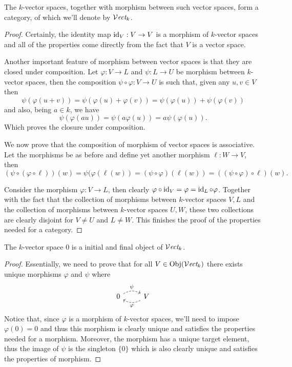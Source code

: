 \begin{proposition}\label{prop: category of vector spaces}
   The \(k\)-vector spaces, together with morphism between such vector spaces,
   form a category, of which we'll denote by \({\mathcal{V}\textit{ect}}_k\).
\end{proposition}

\begin{proof}
   Certainly, the identity map \(\operatorname{id}_V : V \to V\) is a morphism of \(k\)-vector
   spaces and all of the properties come directly from the fact that \(V\) is a
   vector space.

   Another important feature of morphism between vector spaces is that they are
   closed under composition. Let \(\varphi : V \to L\) and \(\psi : L \to U\) be
   morphism between \(k\)-vector spaces, then the composition \(\psi \circ
   \varphi : V \to U\) is such that, given any \(u, v \in V\) then
   \[
      \psi(\varphi(u+v)) = \psi(\varphi(u) + \varphi(v)) = \psi(\varphi(u)) +
      \psi(\varphi(v))
   \]
   and also, being \(a \in k\), we have
   \[
      \psi(\varphi(au)) = \psi(a\varphi(u)) = a \psi(\varphi(u)).
   \]
   Which proves the closure under composition.

   We now prove that the composition of morphism of vector spaces is
   associative. Let the morphisms be as before and define yet another morphism
   \(\ell : W \to V\), then
   \[
      (\psi \circ (\varphi \circ \ell)) (w) = \psi(\varphi(\ell(w)) = (\psi \circ
      \varphi)(\ell(w)) = ((\psi \circ \varphi) \circ \ell) (w).
   \]

   Consider the morphism \(\varphi : V \to L\), then clearly \(\varphi \circ
   \operatorname{id}_V = \varphi = \operatorname{id}_L \circ \varphi\). Together with the fact that the
   collection of morphisms between \(k\)-vector spaces \(V, L\) and the
   collection of morphisms between \(k\)-vector spaces \(U, W\), these two
   collections are clearly disjoint for \(V \neq U\) and \(L \neq W\). This
   finishes the proof of the properties needed for a category.
\end{proof}

\begin{proposition}
   The \(k \)-vector space \(0\) is a initial and final object of
   \({\mathcal{V}\textit{ect}}_k\).
\end{proposition}

\begin{proof}
   Essentially, we need to prove that for all \(V \in \operatorname{Obj}({\mathcal{V}\textit{ect}}_k)\) there
   exists unique morphisms \(\varphi\) and \(\psi\) where
   \[
     \begin{tikzcd}
       0
       \ar[r, bend left, dashed, "\psi"]
         &V
         \ar[l, bend left, dashed, "\varphi"]
     \end{tikzcd}
   \]
   Notice that, since \(\varphi\) is a morphism of \(k\)-vector spaces, we'll
   need to impose \(\varphi(0) = 0\) and thus this morphism is clearly unique
   and satisfies the properties needed for a morphism. Moreover, the morphism
   has a unique target element, thus the image of \(\psi\) is the singleton
   \(\{0\}\) which is also clearly unique and satisfies the properties of
   morphism.
\end{proof}

